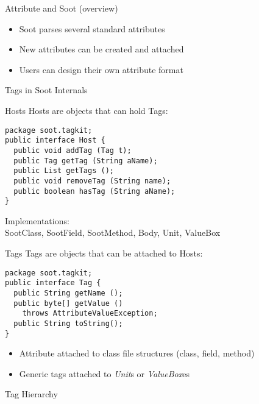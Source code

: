 \begin{slide}{Attribute and Soot (overview)}
\vspace*{-5mm}
\begin{itemize}
\item Soot parses several standard attributes 
\item New attributes can be created and attached 
\item Users can design their own attribute format
\end{itemize}
\end{slide}

\begin{slide}{Tags in Soot Internals}
\end{slide}

\begin{slide}{Hosts}
{\red Host}s are objects that can hold {\red Tag}s:
{\small
\begin{verbatim}
package soot.tagkit;
public interface Host {
  public void addTag (Tag t); 
  public Tag getTag (String aName); 
  public List getTags ();
  public void removeTag (String name); 
  public boolean hasTag (String aName); 
}   
\end{verbatim}
}
Implementations:\\
{\small SootClass, SootField, SootMethod, Body, Unit, ValueBox}
\end{slide}

\begin{slide}{Tags}
{\red Tag}s are objects that can be attached to {\red Host}s:
\small{
\begin{verbatim}
package soot.tagkit;
public interface Tag {
  public String getName ();  
  public byte[] getValue () 
    throws AttributeValueException; 
  public String toString();
}
\end{verbatim}
}
\begin{itemize}
\item {\red Attribute} attached to class file structures (class, field, method)
\item Generic tags attached to {\em Unit}s or {\em ValueBox}es
\end{itemize}
\end{slide}

\begin{slide}{Tag Hierarchy}
\end{slide}

